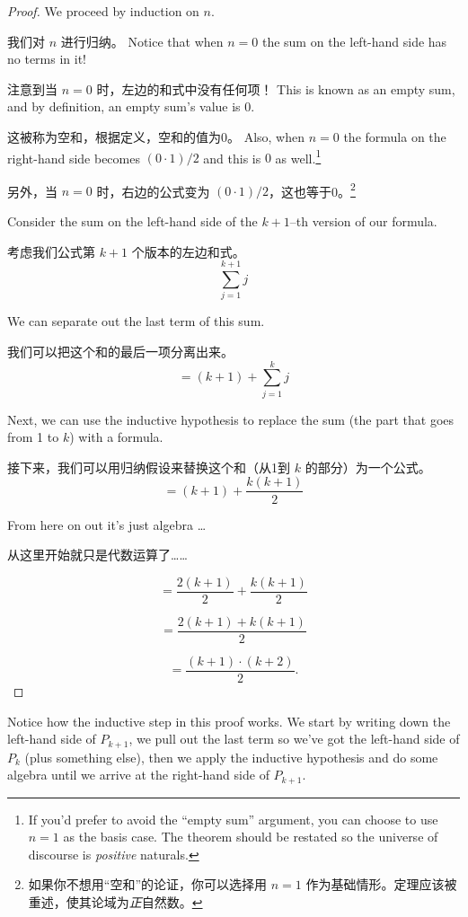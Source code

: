 \begin{proof}
We proceed by induction on $n$.

我们对 $n$ 进行归纳。
  Notice that when $n=0$ the sum on the left-hand side
has no terms in it!

注意到当 $n=0$ 时，左边的和式中没有任何项！
This is known as an  empty sum, and by 
definition, an empty sum's value is $0$.

这被称为空和，根据定义，空和的值为0。
Also, when 
$n=0$ the formula on the right-hand side becomes $(0 \cdot 1)/2$ and this is 
$0$ as well.\footnote{If you'd prefer to avoid the ``empty sum'' argument, %
you can choose to use $n=1$ as the basis case.
The theorem should %
be restated so the universe of discourse is \emph{positive} naturals.}

另外，当 $n=0$ 时，右边的公式变为 $(0 \cdot 1)/2$，这也等于0。\footnote{如果你不想用“空和”的论证，你可以选择用 $n=1$ 作为基础情形。定理应该被重述，使其论域为\emph{正}自然数。}

  Consider the sum on the left-hand side of
the $k+1$--th version of our formula.

考虑我们公式第 $k+1$ 个版本的左边和式。
\[ \sum_{j=1}^{k+1} j \]

We can separate out the last term of this sum.

我们可以把这个和的最后一项分离出来。
\[ = (k+1) + \sum_{j=1}^{k} j \]

Next, we can use the inductive hypothesis to replace the sum (the part 
that goes from 1 to $k$) with a formula.

接下来，我们可以用归纳假设来替换这个和（从1到 $k$ 的部分）为一个公式。
\[ = (k+1) + \frac{k(k+1)}{2} \]

From here on out it's just algebra \ldots

从这里开始就只是代数运算了……

\[ = \frac{2(k+1)}{2} + \frac{k(k+1)}{2} \]

\[ = \frac{2(k+1) + k(k+1)}{2} \]

\[ = \frac{(k+1) \cdot (k+2)}{2}.
\]

\end{proof}
\medskip

Notice how the inductive step in this proof works.  We start by writing
down the left-hand side of $P_{k+1}$, we pull out the last term
so we've got the left-hand side of $P_{k}$ (plus something else), then
we apply the inductive hypothesis and do some algebra until we arrive
at the right-hand side of $P_{k+1}$.

